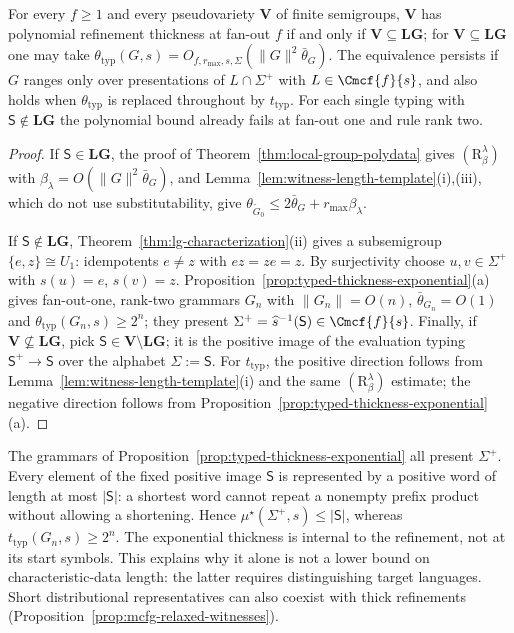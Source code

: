 \begin{corollary}
\label{cor:refinement-dichotomy}
For every $f\ge1$ and every pseudovariety $\mathbf V$ of finite semigroups,
$\mathbf V$ has polynomial refinement thickness at fan-out $f$ if and only if
$\mathbf V\subseteq\mathbf{LG}$; for $\mathbf V\subseteq\mathbf{LG}$ one may take
$\theta_{\mathrm{typ}}(G,s)=O_{f,r_{\max},s,\Sigma}(\|G\|^2\bar\theta_G)$.  The
equivalence persists if $G$ ranges only over presentations of $L\cap\Sigma^+$
with $L\in\Cmcf{f}{s}$, and also holds when $\theta_{\mathrm{typ}}$ is
replaced throughout by $t_{\mathrm{typ}}$.
For each single typing with $\mathsf S\notin\mathbf{LG}$
the polynomial bound already fails at fan-out one and rule rank two.
\end{corollary}

\begin{proof}
If $\mathsf S\in\mathbf{LG}$, the proof of Theorem~\ref{thm:local-group-polydata}
gives $(\mathrm R_\beta^\lambda)$ with $\beta_\lambda=O(\|G\|^2\bar\theta_G)$, and
Lemma~\ref{lem:witness-length-template}(i),(iii), which do not use
substitutability, give
$\theta_{\widetilde G_0}\le2\bar\theta_G+r_{\max}\beta_\lambda$.

If $\mathsf S\notin\mathbf{LG}$, Theorem~\ref{thm:lg-characterization}(ii) gives a
subsemigroup $\{e,z\}\cong U_1$: idempotents $e\ne z$ with $ez=ze=z$.  By
surjectivity choose $u,v\in\Sigma^+$ with $s(u)=e$, $s(v)=z$.
Proposition~\ref{prop:typed-thickness-exponential}(a) gives fan-out-one, rank-two
grammars $G_n$ with $\|G_n\|=O(n)$, $\bar\theta_{G_n}=O(1)$ and
$\theta_{\mathrm{typ}}(G_n,s)\ge2^n$; they present
$\Sigma^+=\widehat s^{-1}(\mathsf S)\in\Cmcf{f}{s}$.  Finally, if
$\mathbf V\not\subseteq\mathbf{LG}$, pick $\mathsf S\in\mathbf V\setminus\mathbf{LG}$;
it is the positive image of the evaluation typing $\mathsf S^+\to\mathsf S$ over the
alphabet $\Sigma:=\mathsf S$.  For $t_{\mathrm{typ}}$, the positive
direction follows from Lemma~\ref{lem:witness-length-template}(i) and
the same $(\mathrm R_{\beta}^{\lambda})$ estimate; the negative
direction follows from
Proposition~\ref{prop:typed-thickness-exponential}(a).
\end{proof}

\begin{remark}
\label{rem:refinement-vs-data}
The grammars of Proposition~\ref{prop:typed-thickness-exponential}
all present $\Sigma^+$. Every element of the fixed positive image
$\mathsf S$ is represented by a positive word of length at most
$|\mathsf S|$: a shortest word cannot repeat a nonempty prefix product
without allowing a shortening. Hence
$\mu^\star(\Sigma^+,s)\le|\mathsf S|$, whereas
$t_{\mathrm{typ}}(G_n,s)\ge2^n$. The exponential thickness is internal
to the refinement, not at its start symbols. This explains why it
alone is not a lower bound on characteristic-data length: the latter
requires distinguishing target languages. Short distributional
representatives can also coexist with thick refinements
(Proposition~\ref{prop:mcfg-relaxed-witnesses}).
\end{remark}

